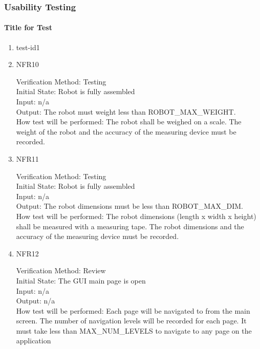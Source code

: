 \documentclass[12pt, titlepage]{article}
\begin{document}
\subsubsection{Usability Testing}
		
\paragraph{Title for Test}

\begin{enumerate}

\item{test-id1\\}


					
\item{NFR10\\}

Verification Method: Testing	\\				
Initial State: Robot is fully assembled	\\			
Input: n/a\\
Output: The robot must weight less than ROBOT\_MAX\_WEIGHT.\\
How test will be performed: The robot shall be weighed on a scale. The weight of the robot and the accuracy of the measuring device must be recorded.\\

\item{NFR11\\}

Verification Method: Testing\\					
Initial State: Robot is fully assembled	\\			
Input: n/a\\
Output: The robot dimensions must be less than ROBOT\_MAX\_DIM.	\\
How test will be performed: The robot dimensions (length x width x height) shall be measured with a measuring tape. The robot dimensions and the accuracy of the measuring device must be recorded.\\

\item{NFR12\\}

Verification Method: Review\\					
Initial State: The GUI main page is open\\			
Input: n/a\\
Output: n/a\\
How test will be performed: Each page will be navigated to from the main screen. The number of navigation levels will be recorded for each page. It must take less than MAX\_NUM\_LEVELS to navigate to any page on the application\\


\end{enumerate}
\end{document}
